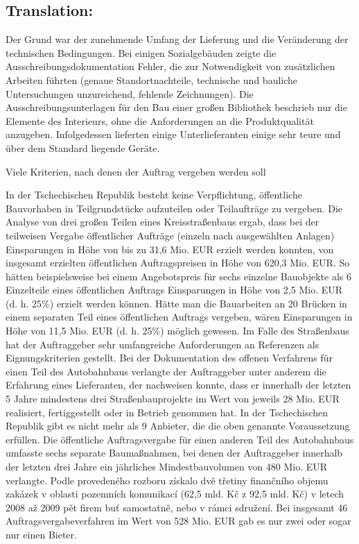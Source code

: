 \documentclass[10pt]{article}
\begin{document}
\pagebreak

\subsection*{Translation:}

Der Grund war der zunehmende Umfang der Lieferung und die Veränderung der technischen Bedingungen.
Bei einigen Sozialgebäuden zeigte die Ausschreibungsdokumentation Fehler, die zur Notwendigkeit von zusätzlichen Arbeiten führten (genaue Standortnachteile, technische und bauliche Untersuchungen unzureichend, fehlende Zeichnungen).
Die Ausschreibungsunterlagen für den Bau einer großen Bibliothek beschrieb nur die Elemente des Interieurs, ohne die Anforderungen an die Produktqualität anzugeben.
Infolgedessen lieferten einige Unterlieferanten einige sehr teure und über dem Standard liegende Geräte.


Viele Kriterien, nach denen der Auftrag vergeben werden soll

In der Tschechischen Republik besteht keine Verpflichtung, öffentliche Bauvorhaben in Teilgrundstücke aufzuteilen oder Teilaufträge zu vergeben.
Die Analyse von drei großen Teilen eines Kreisstraßenbaus ergab, dass bei der teilweisen Vergabe öffentlicher Aufträge (einzeln nach ausgewählten Anlagen) Einsparungen in Höhe von bis zu 31,6 Mio. EUR erzielt werden konnten, von insgesamt erzielten öffentlichen Auftragspreisen in Höhe von 620,3 Mio. EUR.
So hätten beispielsweise bei einem Angebotspreis für sechs einzelne Bauobjekte als 6 Einzelteile eines öffentlichen Auftrags Einsparungen in Höhe von 2,5 Mio. EUR (d. h. 25\%) erzielt werden können.
Hätte man die Bauarbeiten an 20 Brücken in einem separaten Teil eines öffentlichen Auftrags vergeben, wären Einsparungen in Höhe von 11,5 Mio. EUR (d. h. 25\%) möglich gewesen.
Im Falle des Straßenbaus hat der Auftraggeber sehr umfangreiche Anforderungen an Referenzen als Eignungskriterien gestellt.
Bei der Dokumentation des offenen Verfahrens für einen Teil des Autobahnbaus verlangte der Auftraggeber unter anderem die Erfahrung eines Lieferanten, der nachweisen konnte, dass er innerhalb der letzten 5 Jahre mindestens drei Straßenbauprojekte im Wert von jeweils 28 Mio. EUR realisiert, fertiggestellt oder in Betrieb genommen hat.
In der Tschechischen Republik gibt es nicht mehr als 9 Anbieter, die die oben genannte Voraussetzung erfüllen.
Die öffentliche Auftragsvergabe für einen anderen Teil des Autobahnbaus umfasste sechs separate Baumaßnahmen, bei denen der Auftraggeber innerhalb der letzten drei Jahre ein jährliches Mindestbauvolumen von 480 Mio. EUR verlangte.
Podle provedeného rozboru získalo dvě třetiny finančního objemu zakázek v oblasti pozemních komunikací (62,5 mld. Kč z 92,5 mld. Kč) v letech 2008 až 2009 pět firem buť samostatně, nebo v rámci sdružení.
Bei insgesamt 46 Auftragsvergabeverfahren im Wert von 528 Mio. EUR gab es nur zwei oder sogar nur einen Bieter.
\end{document}
